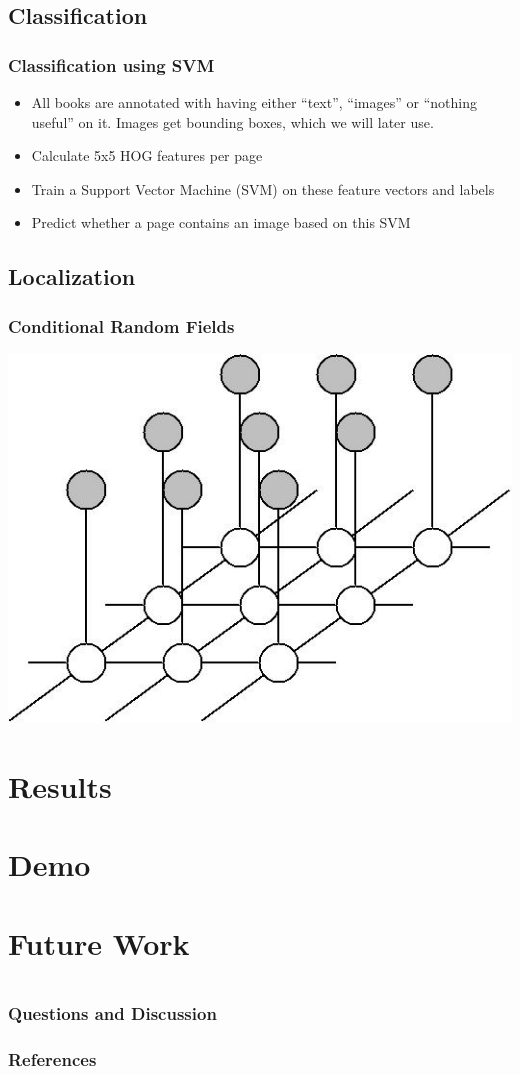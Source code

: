 \documentclass{beamer}
\newcommand{\slide}[2]
{
\begin{frame}
\frametitle{#1} 

#2

\end{frame}
}
\begin{document}
\subsection{Classification}
\slide{Classification using SVM}
{
	\begin{itemize}
		\item All books are annotated with having either ``text'', ``images'' or
		``nothing useful'' on it. Images get bounding boxes, which we will later
		use.
		\item Calculate 5x5 HOG features per page
		\item Train a Support Vector Machine (SVM) on these feature vectors and
		labels
		\item Predict whether a page contains an image based on this SVM
	\end{itemize}
}
\subsection{Localization}
\slide{Conditional Random Fields}
{
	
	\includegraphics[width=.5\paperwidth]{resources/crf}
}

\section{Results}

\section{Demo}

\section{Future Work}

\section{}

\slide{Questions and Discussion}
{}
\begin{frame}[allowframebreaks]
        \frametitle{References}
        
        
\end{frame}
\end{document}
